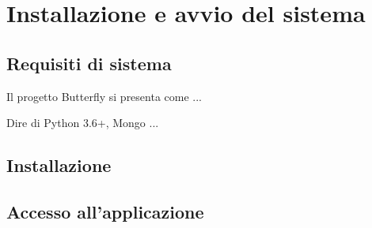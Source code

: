 \section{Installazione e avvio del sistema}

\subsection{Requisiti di sistema}

Il progetto Butterfly si presenta come ...

Dire di Python 3.6+, Mongo ...

\subsection{Installazione} %

\subsection{Accesso all'applicazione}
